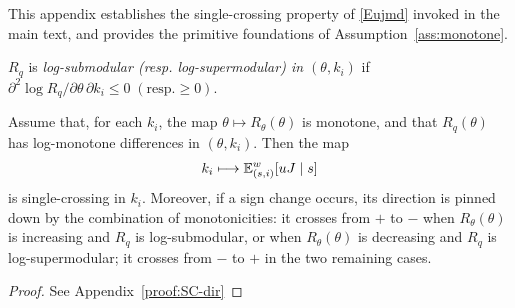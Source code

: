 \documentclass{class}
\begin{document}
This appendix establishes the single-crossing property of \ref{Eujmd} invoked in the main text, and provides the primitive foundations of Assumption~\ref{ass:monotone}.

\begin{definition}
$R_q$ is \emph{log-submodular (resp. log-supermodular) in $(\theta,k_i)$} if $\partial^2 \log R_q/\partial\theta\,\partial k_i\leq 0 \; (\text{resp.} \geq 0) $.
\end{definition}

\begin{lemma}\label{lem:SC-dir}
Assume that, for each \(k_i\), the map \(\theta\mapsto R_\theta(\theta)\) is monotone, and that \(R_q(\theta)\) has log-monotone differences in \((\theta,k_i)\). Then the map
\[
k_i \longmapsto \mathbb{E}_{(s,i)}^w[uJ\mid s]
\]
is single-crossing in $k_i$. Moreover, if a sign change occurs, its direction is pinned down by the combination of monotonicities: it crosses from $+$ to $-$ when $R_\theta(\theta)$ is increasing and $R_q$ is log-submodular, or when $R_\theta(\theta)$ is decreasing and $R_q$ is log-supermodular; it crosses from $-$ to $+$ in the two remaining cases.
\end{lemma}
\begin{proof}
    See Appendix~\ref{proof:SC-dir}
\end{proof}
\end{document}
